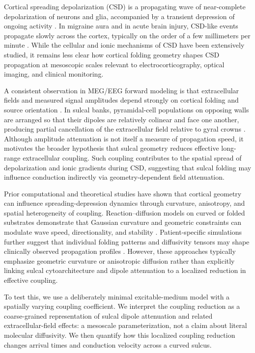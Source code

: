 \documentclass[12pt]{article}
\begin{document}
Cortical spreading depolarization (CSD) is a propagating wave of near-complete depolarization of neurons and glia, accompanied by a transient depression of ongoing activity \citep{mathew2022}. In migraine aura and in acute brain injury, CSD-like events propagate slowly across the cortex, typically on the order of a few millimeters per minute \citep{Pietrobon2014,Ayata2015,Woitzik2013}. While the cellular and ionic mechanisms of CSD have been extensively studied, it remains less clear how cortical folding geometry shapes CSD propagation at mesoscopic scales relevant to electrocorticography, optical imaging, and clinical monitoring.

A consistent observation in MEG/EEG forward modeling is that extracellular fields and measured signal amplitudes depend strongly on cortical folding and source orientation \citep{Ahlfors2010, ahlfors2010cancellation}. In sulcal banks, pyramidal-cell populations on opposing walls are arranged so that their dipoles are relatively colinear and face one another, producing partial cancellation of the extracellular field relative to gyral crowns \citep{Murakami2006,Ahlfors2010,Muller2023,Reimann2022}. Although amplitude attenuation is not itself a measure of propagation speed, it motivates the broader hypothesis that sulcal geometry reduces effective long-range extracellular coupling. Such coupling contributes to the spatial spread of depolarization and ionic gradients during CSD, suggesting that sulcal folding may influence conduction indirectly via geometry-dependent field attenuation.

Prior computational and theoretical studies have shown that cortical geometry can influence spreading-depression dynamics through curvature, anisotropy, and spatial heterogeneity of coupling. Reaction--diffusion models on curved or folded substrates demonstrate that Gaussian curvature and geometric constraints can modulate wave speed, directionality, and stability \citep{Tuckwell1978,Tuckwell2008,Chapuisat2007,Kenny2019}. Patient-specific simulations further suggest that individual folding patterns and diffusivity tensors may shape clinically observed propagation profiles \citep{Kroos2019}. However, these approaches typically emphasize geometric curvature or anisotropic diffusion rather than explicitly linking sulcal cytoarchitecture and dipole attenuation to a localized reduction in effective coupling.

To test this, we use a deliberately minimal excitable-medium model with a spatially varying coupling coefficient. We interpret the coupling reduction as a coarse-grained representation of sulcal dipole attenuation and related extracellular-field effects: a mesoscale parameterization, not a claim about literal molecular diffusivity. We then quantify how this localized coupling reduction changes arrival times and conduction velocity across a curved sulcus.
\end{document}
